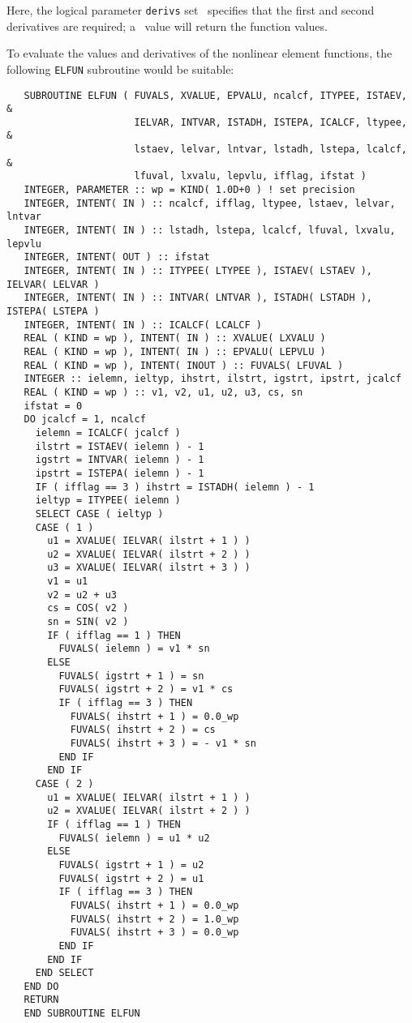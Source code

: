 \documentclass{galahad}
\begin{document}
\noindent
Here, the logical parameter {\tt derivs} set \true\ specifies that the first
and second derivatives are required; a \false\ value will return the
function values.

To evaluate the values and derivatives of the nonlinear element
functions, the following {\tt ELFUN} subroutine would be suitable:

\def\baselinestretch{0.8}
{%
{\tt \begin{verbatim}
   SUBROUTINE ELFUN ( FUVALS, XVALUE, EPVALU, ncalcf, ITYPEE, ISTAEV, &
                      IELVAR, INTVAR, ISTADH, ISTEPA, ICALCF, ltypee, &
                      lstaev, lelvar, lntvar, lstadh, lstepa, lcalcf, &
                      lfuval, lxvalu, lepvlu, ifflag, ifstat )
   INTEGER, PARAMETER :: wp = KIND( 1.0D+0 ) ! set precision
   INTEGER, INTENT( IN ) :: ncalcf, ifflag, ltypee, lstaev, lelvar, lntvar
   INTEGER, INTENT( IN ) :: lstadh, lstepa, lcalcf, lfuval, lxvalu, lepvlu
   INTEGER, INTENT( OUT ) :: ifstat
   INTEGER, INTENT( IN ) :: ITYPEE( LTYPEE ), ISTAEV( LSTAEV ), IELVAR( LELVAR )
   INTEGER, INTENT( IN ) :: INTVAR( LNTVAR ), ISTADH( LSTADH ), ISTEPA( LSTEPA )
   INTEGER, INTENT( IN ) :: ICALCF( LCALCF )
   REAL ( KIND = wp ), INTENT( IN ) :: XVALUE( LXVALU )
   REAL ( KIND = wp ), INTENT( IN ) :: EPVALU( LEPVLU )
   REAL ( KIND = wp ), INTENT( INOUT ) :: FUVALS( LFUVAL )
   INTEGER :: ielemn, ieltyp, ihstrt, ilstrt, igstrt, ipstrt, jcalcf
   REAL ( KIND = wp ) :: v1, v2, u1, u2, u3, cs, sn
   ifstat = 0
   DO jcalcf = 1, ncalcf
     ielemn = ICALCF( jcalcf )
     ilstrt = ISTAEV( ielemn ) - 1
     igstrt = INTVAR( ielemn ) - 1
     ipstrt = ISTEPA( ielemn ) - 1
     IF ( ifflag == 3 ) ihstrt = ISTADH( ielemn ) - 1
     ieltyp = ITYPEE( ielemn )
     SELECT CASE ( ieltyp )
     CASE ( 1 )
       u1 = XVALUE( IELVAR( ilstrt + 1 ) )
       u2 = XVALUE( IELVAR( ilstrt + 2 ) )
       u3 = XVALUE( IELVAR( ilstrt + 3 ) )
       v1 = u1
       v2 = u2 + u3
       cs = COS( v2 )
       sn = SIN( v2 )
       IF ( ifflag == 1 ) THEN
         FUVALS( ielemn ) = v1 * sn
       ELSE
         FUVALS( igstrt + 1 ) = sn
         FUVALS( igstrt + 2 ) = v1 * cs
         IF ( ifflag == 3 ) THEN
           FUVALS( ihstrt + 1 ) = 0.0_wp
           FUVALS( ihstrt + 2 ) = cs
           FUVALS( ihstrt + 3 ) = - v1 * sn
         END IF
       END IF
     CASE ( 2 )
       u1 = XVALUE( IELVAR( ilstrt + 1 ) )
       u2 = XVALUE( IELVAR( ilstrt + 2 ) )
       IF ( ifflag == 1 ) THEN
         FUVALS( ielemn ) = u1 * u2
       ELSE
         FUVALS( igstrt + 1 ) = u2
         FUVALS( igstrt + 2 ) = u1
         IF ( ifflag == 3 ) THEN
           FUVALS( ihstrt + 1 ) = 0.0_wp
           FUVALS( ihstrt + 2 ) = 1.0_wp
           FUVALS( ihstrt + 3 ) = 0.0_wp
         END IF
       END IF
     END SELECT
   END DO
   RETURN
   END SUBROUTINE ELFUN
\end{verbatim} } }
\def\baselinestretch{1.0}
\end{document}
